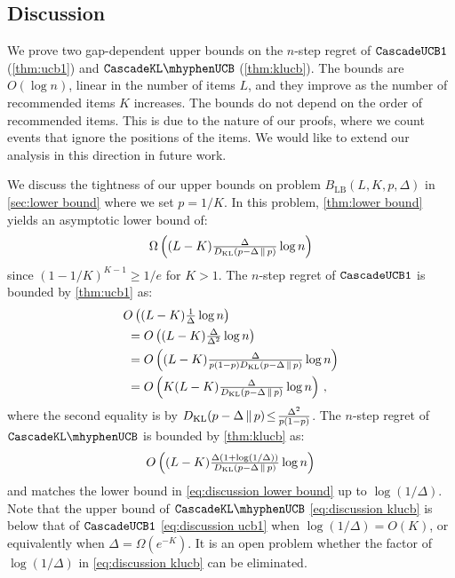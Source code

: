 
\subsection{Discussion}
\label{sec:discussion}

We prove two gap-dependent upper bounds on the $n$-step regret of ${\tt CascadeUCB1}$ (\cref{thm:ucb1}) and $\cascadeklucb$ (\cref{thm:klucb}). The bounds are $O(\log n)$, linear in the number of items $L$, and they improve as the number of recommended items $K$ increases. The bounds do not depend on the order of recommended items. This is due to the nature of our proofs, where we count events that ignore the positions of the items. We would like to extend our analysis in this direction in future work.

We discuss the tightness of our upper bounds on problem $B_\mathrm{LB}(L, K, p, \Delta)$ in \cref{sec:lower bound} where we set $p = 1 / K$. In this problem, \cref{thm:lower bound} yields an asymptotic lower bound of:
\begin{align}
  \textstyle \Omega\left((L - K) \frac{\Delta}{D_\mathrm{KL}(p - \Delta \,\|\, p)} \log n\right)
  \label{eq:discussion lower bound}
\end{align}
since $(1 - 1 / K)^{K - 1} \geq 1 / e$ for $K > 1$. The $n$-step regret of ${\tt CascadeUCB1}$ is bounded by \cref{thm:ucb1} as:
\begin{align}
  & \textstyle O\left((L - K) \frac{1}{\Delta} \log n\right) \nonumber \\
  & \textstyle \ = O\left((L - K) \frac{\Delta}{\Delta^2} \log n\right) \nonumber \\
  & \textstyle \ = O\left((L - K) \frac{\Delta}{p (1 - p) D_\mathrm{KL}(p - \Delta \,\|\, p)} \log n\right) \nonumber \\
  & \textstyle \ = O\left(K (L - K) \frac{\Delta}{D_\mathrm{KL}(p - \Delta \,\|\, p)} \log n\right)\,,
  \label{eq:discussion ucb1}
\end{align}
where the second equality is by $D_\mathrm{KL}(p - \Delta \,\|\, p) \! \leq \! \frac{\Delta^2}{p (1 - p)}$. The $n$-step regret of $\cascadeklucb$ is bounded by \cref{thm:klucb} as:
\begin{align}
  \textstyle O\left((L - K) \frac{\Delta (1 + \log(1 / \Delta))}{D_\mathrm{KL}(p - \Delta \,\|\, p)} \log n\right)
  \label{eq:discussion klucb}
\end{align}
and matches the lower bound in \eqref{eq:discussion lower bound} up to $\log(1 / \Delta)$. Note that the upper bound of $\cascadeklucb$ \eqref{eq:discussion klucb} is below that of ${\tt CascadeUCB1}$ \eqref{eq:discussion ucb1} when $\log(1 / \Delta) = O(K)$, or equivalently when $\Delta = \Omega(e^{- K})$. It is an open problem whether the factor of $\log(1 / \Delta)$ in \eqref{eq:discussion klucb} can be eliminated.
